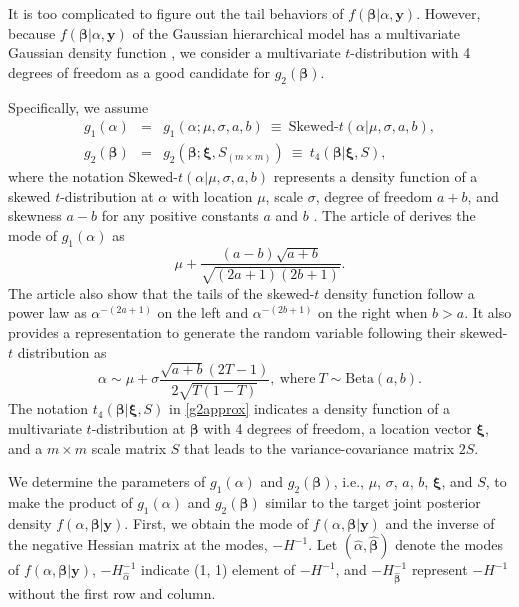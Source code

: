 \documentclass[article]{jss}
\begin{document}
It is too complicated to figure out the tail behaviors of $f(\boldsymbol{\beta} \vert \alpha,  \boldsymbol{y})$. However, because $f(\boldsymbol{\beta} \vert \alpha,  \boldsymbol{y})$ of the Gaussian hierarchical model has a multivariate Gaussian density function \citep{tang2011, kelly2014advances}, we consider a multivariate $t$-distribution with 4  degrees of freedom as a good candidate for $g_2(\boldsymbol{\beta})$.


Specifically, we assume
\begin{eqnarray}\label{env}
g_1(\alpha) &=& g_1(\alpha; \mu, \sigma, a, b)~\equiv~\textrm{Skewed-}t(\alpha\vert\mu, \sigma, a, b),\\
g_2(\boldsymbol{\beta}) &=& g_2(\boldsymbol{\beta}; \boldsymbol{\xi}, S_{(m\times m)})~\equiv~t_{4}(\boldsymbol{\beta}\vert \boldsymbol{\xi}, S),\label{g2approx}
\end{eqnarray}
where the notation Skewed-$t(\alpha\vert\mu, \sigma, a, b)$ represents a density function of a skewed $t$-distribution  at $\alpha$ with location $\mu$, scale $\sigma$, degree of freedom $a+b$, and skewness $a-b$ for any positive constants $a$ and $b$ \citep{jones2003skew}. The article of \cite{jones2003skew} derives the mode of $g_1(\alpha)$ as
\begin{equation}\label{mode}
\mu+\frac{(a-b)\sqrt{a+b}}{\sqrt{(2a+1)(2b+1)}}.
\end{equation} 
The article also show that the tails of the skewed-$t$ density function  follow a power law as $\alpha^{-(2a+1)}$ on the left and $\alpha^{-(2b+1)}$ on the right when $b>a$. It also provides a representation to generate the random variable following their skewed-$t$ distribution as
\begin{equation}
\alpha\sim \mu+\sigma\frac{\sqrt{a+b}(2T-1)}{2\sqrt{T(1-T)}}, ~\textrm{where}~ T\sim \textrm{Beta}(a, b).
\end{equation}
The notation $t_{4}(\boldsymbol{\beta}\vert\boldsymbol{\xi}, S)$ in  \eqref{g2approx} indicates a density function of a multivariate $t$-distribution at $\boldsymbol{\beta}$ with 4 degrees of freedom, a location vector $\boldsymbol{\xi}$, and a $m\times m$ scale matrix $S$ that leads to the variance-covariance matrix $2S$. 

We determine the parameters of $g_1(\alpha)$ and $g_2(\boldsymbol{\beta})$, i.e., $\mu$, $\sigma$, $a$, $b$, $\boldsymbol{\xi}$, and $S$, to make the product of $g_1(\alpha)$ and $g_2(\boldsymbol{\beta})$ similar to the target joint posterior density $f(\alpha, \boldsymbol{\beta} \vert  \boldsymbol{y})$. First, we obtain the  mode of $f(\alpha, \boldsymbol{\beta} \vert  \boldsymbol{y})$ and the inverse of the  negative Hessian matrix at the modes, $-H^{-1}$. Let $(\hat{\alpha}, \hat{\boldsymbol{\beta}})$ denote the modes of $f(\alpha, \boldsymbol{\beta} \vert  \boldsymbol{y})$, $-H^{-1}_{\hat{\alpha}}$ indicate (1, 1) element of $-H^{-1}$, and $-H^{-1}_{\hat{\boldsymbol{\beta}}}$ represent  $-H^{-1}$ without the first row and  column. 
\end{document}
